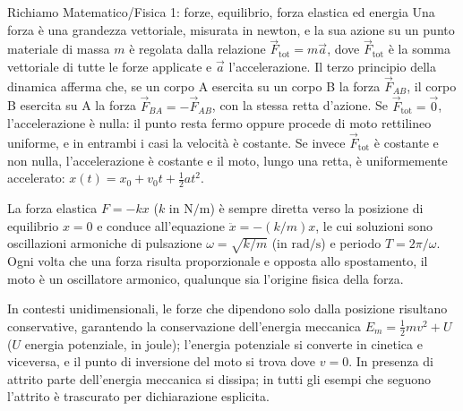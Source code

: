 \documentclass[11pt,a4paper]{article}
\newcommand{\Fv}{\vec{F}}
\begin{document}
\begin{richiamo}{Richiamo Matematico/Fisica 1: forze, equilibrio, forza elastica ed energia}
Una forza è una grandezza vettoriale, misurata in newton, e la sua azione su un punto materiale di massa $m$ è regolata dalla relazione $\Fv_{\mathrm{tot}}=m\vec a$, dove $\Fv_{\mathrm{tot}}$ è la somma vettoriale di tutte le forze applicate e $\vec a$ l'accelerazione. Il terzo principio della dinamica afferma che, se un corpo A esercita su un corpo B la forza $\Fv_{AB}$, il corpo B esercita su A la forza $\Fv_{BA}=-\Fv_{AB}$, con la stessa retta d'azione. Se $\Fv_{\mathrm{tot}}=\vec 0$, l'accelerazione è nulla: il punto resta fermo oppure procede di moto rettilineo uniforme, e in entrambi i casi la velocità è costante. Se invece $\Fv_{\mathrm{tot}}$ è costante e non nulla, l'accelerazione è costante e il moto, lungo una retta, è uniformemente accelerato: $x(t)=x_0+v_0t+\tfrac12 a t^2$.

La forza elastica $F = -kx$ ($k$ in $\mathrm{N/m}$) è sempre diretta verso la posizione di equilibrio $x = 0$ e conduce all'equazione $\ddot{x} = -(k/m)x$, le cui soluzioni sono oscillazioni armoniche di pulsazione $\omega = \sqrt{k/m}$ (in $\mathrm{rad/s}$) e periodo $T = 2\pi/\omega$. Ogni volta che una forza risulta proporzionale e opposta allo spostamento, il moto è un oscillatore armonico, qualunque sia l'origine fisica della forza.

In contesti unidimensionali, le forze che dipendono solo dalla posizione risultano conservative, garantendo la conservazione dell'energia meccanica $E_m = \frac{1}{2}mv^2 + U$ ($U$ energia potenziale, in joule); l'energia potenziale si converte in cinetica e viceversa, e il punto di inversione del moto si trova dove $v = 0$. In presenza di attrito parte dell'energia meccanica si dissipa; in tutti gli esempi che seguono l'attrito è trascurato per dichiarazione esplicita.

\end{richiamo}
\end{document}

